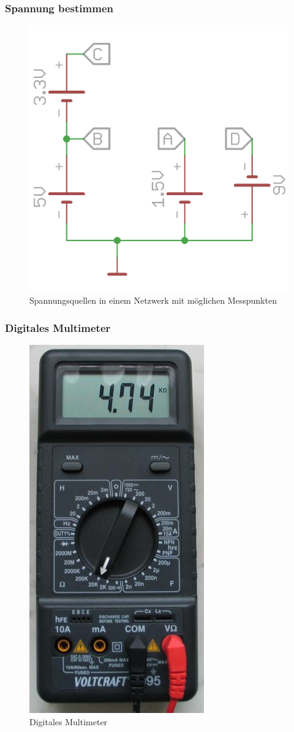 \begin{frame}
  \frametitle{Spannung bestimmen}
  \begin{center}
    \begin{figure}
      \includegraphics[width=.5\textwidth,height=.75\textheight,keepaspectratio]{e02/Spannung.png}
      \caption{Spannungsquellen in einem Netzwerk mit möglichen Messpunkten}
    \end{figure}
  \end{center}
\end{frame}

\begin{frame}
  \frametitle{Digitales Multimeter}
  \begin{center}
    \begin{figure}
      \includegraphics[width=.25\textwidth,height=.75\textheight,keepaspectratio]{e02/digitalmultimeter.jpg}
      \caption{Digitales Multimeter \cite{multimeter}}
      \label{fig_multimeter}
    \end{figure}
  \end{center}
\end{frame}

